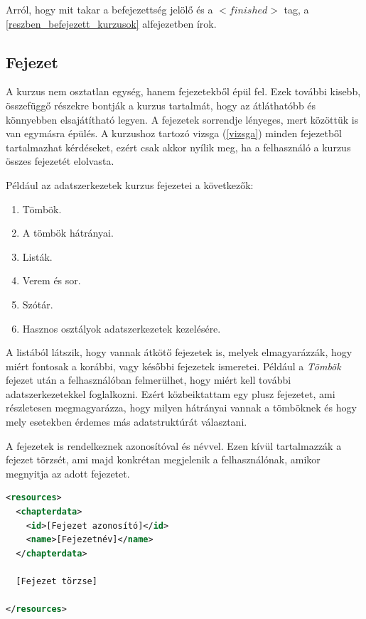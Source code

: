 \documentclass[12pt,a4paper]{article}
\begin{document}
	Arról, hogy mit takar a befejezettség jelölő és a $<finished>$ tag, a \ref{reszben_befejezett_kurzusok} alfejezetben írok.
	
	\subsection{Fejezet}\label{fejezet}
	
	A kurzus nem osztatlan egység, hanem fejezetekből épül fel. Ezek további kisebb, összefüggő részekre bontják a kurzus tartalmát, hogy az átláthatóbb és könnyebben elsajátítható legyen. A fejezetek sorrendje lényeges, mert közöttük is van egymásra épülés. A kurzushoz tartozó vizsga (\ref{vizsga}) minden fejezetből tartalmazhat kérdéseket, ezért csak akkor nyílik meg, ha a felhasználó a kurzus összes fejezetét elolvasta.
	
	Például az adatszerkezetek kurzus fejezetei a következők:
	
	\begin{enumerate}
		\item Tömbök.
		\item A tömbök hátrányai.
		\item Listák.
		\item Verem és sor.
		\item Szótár.
		\item Hasznos osztályok adatszerkezetek kezelésére.
	\end{enumerate}  

	A listából látszik, hogy vannak átkötő fejezetek is, melyek elmagyarázzák, hogy miért fontosak a korábbi, vagy későbbi fejezetek ismeretei. Például a \textit{Tömbök} fejezet után a felhasználóban felmerülhet, hogy miért kell további adatszerkezetekkel foglalkozni. Ezért közbeiktattam egy plusz fejezetet, ami részletesen megmagyarázza, hogy milyen hátrányai vannak a tömböknek és hogy mely esetekben érdemes más adatstruktúrát választani.
	
	A fejezetek is rendelkeznek azonosítóval és névvel. Ezen kívül tartalmazzák a fejezet törzsét, ami majd konkrétan megjelenik a felhasználónak, amikor megnyitja az adott fejezetet. 
	
	\bigskip
	\begin{lstlisting}[language=XML]
<resources>
  <chapterdata>
	<id>[Fejezet azonosító]</id>
    <name>[Fejezetnév]</name>
  </chapterdata>

  [Fejezet törzse]	
	
</resources>
	\end{lstlisting}
	
\end{document}
